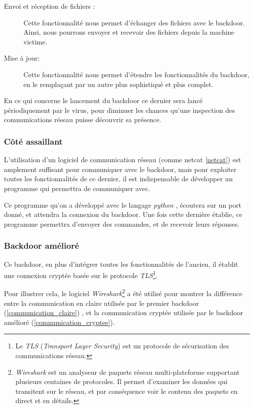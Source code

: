 \begin{description}
            \item[Envoi et réception de fichiers :] Cette fonctionnalité nous permet d'échanger des fichiers 
                avec le backdoor. Ainsi, nous pourrons envoyer et recevoir des fichiers depuis la machine victime.%

            \item[Mise à jour:] Cette fonctionnalité nous permet d'étendre les fonctionnalités du
                backdoor, en le remplaçant par un autre plus sophistiqué et plus complet. 
        \end{description}

        En ce qui concerne le lancement du backdoor ce dernier sera lancé périodiquement par le virus, pour 
        diminuer les chances qu'une inspection des communications réseau puisse découvrir sa présence.%

        \subsubsection{Côté assaillant}
        L'utilisation d'un logiciel de communication réseau (comme netcat \autoref{netcat}) 
        est amplement suffisant pour communiquer avec 
        le backdoor, mais pour exploiter toutes les fonctionnalités de ce dernier, il est indispensable 
        de développer un programme qui permettra de communiquer avec. %

        Ce programme qu'on a développé avec le langage \emph{python} \cite{python}, écoutera sur un port donné, 
        et attendra la connexion du backdoor. Une fois cette dernière établie, ce programme permettra d'envoyer 
        des commandes, et de recevoir leurs réponses.

        \subsubsection{Backdoor amélioré}
        Ce backdoor, en plus d'intégrer toutes les fonctionnalités de l'ancien, il établit une connexion 
        cryptée basée sur le protocole \emph{TLS}\footnote{Le \emph{TLS} (\emph{Transport Layer Security})
        est un protocole de sécurisation des communications réseau.}.%

        Pour illustrer cela, le logiciel \emph{Wireshark}\footnote{\emph{Wireshark} est un analyseur de 
        paquets réseau multi-plateforme supportant plusieurs centaines de protocoles. Il permet d’examiner les 
        données qui transitent sur le réseau, et par conséquence voir le contenu des paquets en direct et en détails.} 
        a été utilisé pour montrer la différence entre la communication 
        en claire utilisée par le premier backdoor (\autoref{communication_claire})
        , et la communication cryptée utilisée par le backdoor amélioré (\autoref{communication_cryptee}).

